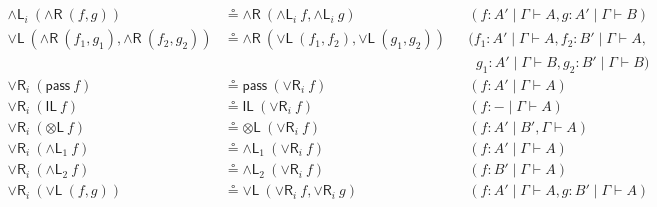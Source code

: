 \documentclass[submission,copyright,creativecommons]{eptcs}
\theoremstyle{definition}
\newcommand{\tl}{\otimes \mathsf{L}}
\newcommand{\pass}{\mathsf{pass}}
\newcommand{\unitl}{\mathsf{IL}}
\newcommand{\andlone}{\land \mathsf{L}_{1}}
\newcommand{\andltwo}{\land \mathsf{L}_{2}}
\newcommand{\andli}{\land \mathsf{L}_{i}}
\newcommand{\andr}{\land \mathsf{R}}
\newcommand{\orl}{\lor \mathsf{L}}
\newcommand{\orrone}{\lor \mathsf{R}_{1}}
\newcommand{\orrtwo}{\lor \mathsf{R}_{2}}
\newcommand{\orri}{\lor \mathsf{R}_{i}}
\begin{document}
\begin{equation*}
\begin{array}{rlll}
    \\
    \andli \ (\andr \ (f , g)) &\circeq  \andr \ (\andli \ f , \andli \ g) &&(f : A' \mid \Gamma \vdash A , g : A' \mid \Gamma \vdash B)
    \\
    \orl \ (\andr \ (f_1 , g_1) , \andr \ (f_2 , g_2)) &\circeq  \andr \ (\orl \ (f_1 , f_2) , \orl \ (g_1 , g_2)) &&(f_1 : A' \mid \Gamma \vdash A , f_2 : B' \mid \Gamma \vdash A , 
    \\
    & &&\;\;g_1 : A' \mid \Gamma \vdash B , g_2 : B' \mid \Gamma \vdash B)
    \\
    \orri \ (\pass \ f) &\circeq \pass \ (\orri \ f) &&(f : A' \mid \Gamma \vdash A)
    \\
    \orri \ (\unitl \ f) &\circeq \unitl \ (\orri \ f) &&(f : - \mid \Gamma \vdash A)
    \\
    \orri \ (\tl \ f) &\circeq \tl \ (\orri \ f) &&(f : A' \mid B' , \Gamma \vdash A)
    \\
    \orri \ (\andlone \ f) &\circeq \andlone \ (\orri \ f) &&(f : A' \mid \Gamma \vdash A)
    \\
    \orri \ (\andltwo \ f) &\circeq \andltwo \ (\orri \ f) &&(f : B' \mid \Gamma \vdash A)
    \\
    \orri \ (\orl \ (f , g)) &\circeq \orl \ (\orri \ f , \orri \ g) &&(f : A' \mid \Gamma \vdash A , g : B' \mid \Gamma \vdash A)
  \end{array}
  \end{equation*}
\end{document}
